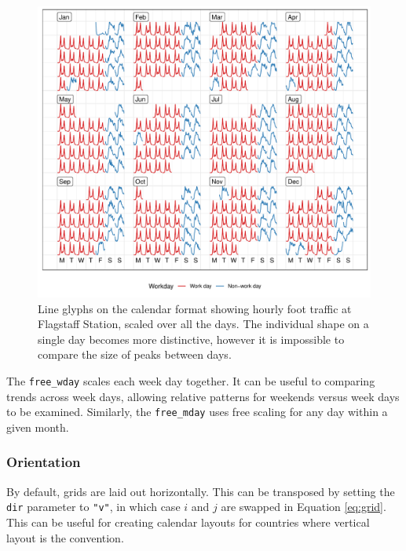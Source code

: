 \documentclass[12pt]{article}
\begin{document}
\begin{figure}

{\centering \includegraphics[width=\textwidth]{figure/fs-free-1} 

}

\caption{Line glyphs on the calendar format showing hourly foot traffic at Flagstaff Station, scaled over all the days. The individual shape on a single day becomes more distinctive, however it is impossible to compare the size of peaks between days.}\label{fig:fs-free}
\end{figure}

The \texttt{free\_wday} scales each week day together. It can be useful
to comparing trends across week days, allowing relative patterns for
weekends versus week days to be examined. Similarly, the
\texttt{free\_mday} uses free scaling for any day within a given month.

\hypertarget{orientation}{%
\subsubsection{Orientation}\label{orientation}}

By default, grids are laid out horizontally. This can be transposed by
setting the \texttt{dir} parameter to \texttt{"v"}, in which case \(i\)
and \(j\) are swapped in Equation \ref{eq:grid}. This can be useful for
creating calendar layouts for countries where vertical layout is the
convention.
\end{document}
